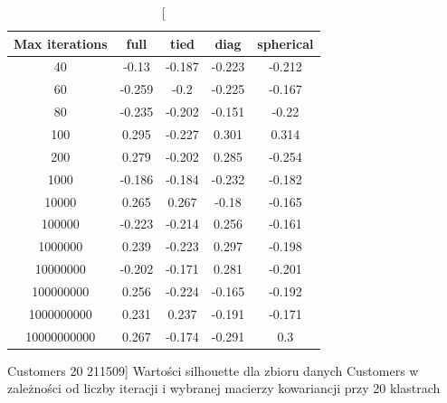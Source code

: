 \documentclass{classrep}
\begin{document}
{{\begin{table}[!htbp]
                \begin{minipage}{1\textwidth}
                \centering
                \begin{tabular}{|c|c|c|c|c|}
                \hline
                Max iterations & full & tied & diag & spherical \\ \hline
                40 & -0.13 & -0.187 & -0.223 & -0.212 \\ \hline
                60 & -0.259 & -0.2 & -0.225 & -0.167 \\ \hline
                80 & -0.235 & -0.202 & -0.151 & -0.22 \\ \hline
                100 & 0.295 & -0.227 & 0.301 & 0.314 \\ \hline
                200 & 0.279 & -0.202 & 0.285 & -0.254 \\ \hline
                1000 & -0.186 & -0.184 & -0.232 & -0.182 \\ \hline
                10000 & 0.265 & 0.267 & -0.18 & -0.165 \\ \hline
                100000 & -0.223 & -0.214 & 0.256 & -0.161 \\ \hline
                1000000 & 0.239 & -0.223 & 0.297 & -0.198 \\ \hline
                10000000 & -0.202 & -0.171 & 0.281 & -0.201 \\ \hline
                100000000 & 0.256 & -0.224 & -0.165 & -0.192 \\ \hline
                1000000000 & 0.231 & 0.237 & -0.191 & -0.171 \\ \hline
                10000000000 & 0.267 & -0.174 & -0.291 & 0.3 \\ \hline
                \end{tabular}
                \caption
                [Customers 20 211509]
                {Wartości silhouette dla zbioru danych Customers w zależności od
                liczby iteracji i wybranej macierzy kowariancji przy 20 klastrach}
                \label{Customers_20_211509}
                \end{minipage}
                \hfill
            \end{table}
            
}}
\end{document}
